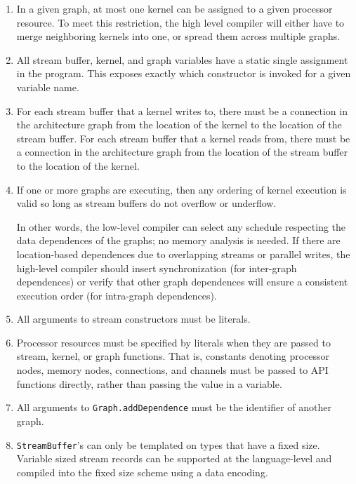 \begin{enumerate}

\item In a given graph, at most one kernel can be assigned to a given processor resource.  To
meet this restriction, the high level compiler will either have to merge neighboring kernels
into one, or spread them across multiple graphs.

\item All stream buffer, kernel, and graph variables have a static single assignment in the
program.  This exposes exactly which constructor is invoked for a given variable name.

\item For each stream buffer that a kernel writes to, there must be a
connection in the architecture graph from the location of the kernel
to the location of the stream buffer.  For each stream buffer that a
kernel reads from, there must be a connection in the architecture
graph from the location of the stream buffer to the location of the
kernel.

\item If one or more graphs are executing, then any ordering of kernel
execution is valid so long as stream buffers do not overflow or underflow.

In other words, the low-level compiler can select any schedule
respecting the data dependences of the graphs; no memory analysis is
needed.  If there are location-based dependences due to overlapping
streams or parallel writes, the high-level compiler should insert
synchronization (for inter-graph dependences) or verify that other
graph dependences will ensure a consistent execution order (for
intra-graph dependences).

\item All arguments to stream constructors must be literals.

\item Processor resources must be specified by literals when they are
passed to stream, kernel, or graph functions.  That is, constants
denoting processor nodes, memory nodes, connections, and channels must
be passed to API functions directly, rather than passing the value in
a variable.

\item All arguments to {\tt Graph.addDependence} must be the identifier of
another graph.

\item {\tt StreamBuffer}'s can only be templated on types that have a
fixed size.  Variable sized stream records can be supported at the
language-level and compiled into the fixed size scheme using a data
encoding.


\end{enumerate}
